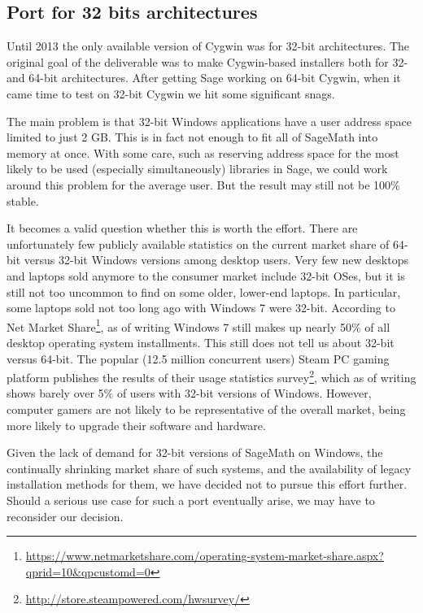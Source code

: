 \hypertarget{port-for-32-bits-architectures}{%
\subsection{Port for 32 bits
architectures}\label{port-for-32-bits-architectures}}

Until 2013 the only available version of Cygwin was for 32-bit
architectures. The original goal of the deliverable was to make
Cygwin-based installers both for 32- and 64-bit architectures. After
getting Sage working on 64-bit Cygwin, when it came time to test on
32-bit Cygwin we hit some significant snags.

The main problem is that 32-bit Windows applications have a user address
space limited to just 2 GB. This is in fact not enough to fit all of
SageMath into memory at once. With some care, such as reserving address
space for the most likely to be used (especially simultaneously)
libraries in Sage, we could work around this problem for the average user.
But the result may still not be 100\% stable.

It becomes a valid question whether this is worth the effort. There are
unfortunately few publicly available statistics on the current market
share of 64-bit versus 32-bit Windows versions among desktop users. Very
few new desktops and laptops sold anymore to the consumer market include
32-bit OSes, but it is still not too uncommon to find on some older,
lower-end laptops. In particular, some laptops sold not too long ago
with Windows 7 were 32-bit. According to Net Market Share\footnote{\url{https://www.netmarketshare.com/operating-system-market-share.aspx?qprid=10\&qpcustomd=0}},
as of writing Windows 7 still makes up nearly 50\% of all desktop
operating system installments. This still does not tell us about 32-bit
versus 64-bit. The popular (12.5 million concurrent users) Steam PC
gaming platform publishes the results of their usage statistics
survey\footnote{\url{http://store.steampowered.com/hwsurvey/}}, which as
of writing shows barely over 5\% of users with 32-bit versions of
Windows. However, computer gamers are not likely to be representative of
the overall market, being more likely to upgrade their software and
hardware.

Given the lack of demand for 32-bit versions of SageMath on Windows, the
continually shrinking market share of such systems, and the availability of
legacy installation methods for them, we have decided not to pursue this effort
further. Should a serious use case for such a port eventually arise, we may
have to reconsider our decision.

